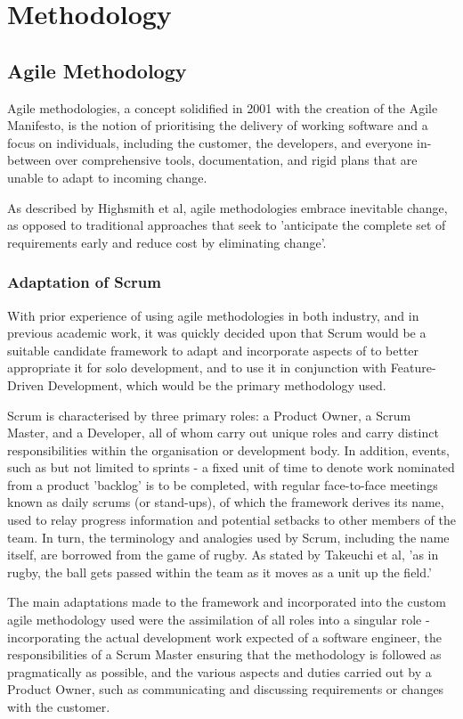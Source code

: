 \chapter{Methodology}

\section{Agile Methodology}
Agile methodologies, a concept solidified in 2001 with the creation of the Agile Manifesto, is the notion of prioritising the delivery of working software and a focus on individuals, including the customer, the developers, and everyone in-between over comprehensive tools, documentation, and rigid plans that are unable to adapt to incoming change. \cite{AgileAlliance1}

As described by Highsmith et al, agile methodologies embrace inevitable change, as opposed to traditional approaches that seek to 'anticipate the complete set of requirements early and reduce cost by eliminating change'. \cite{947100}

\subsection{Adaptation of Scrum}
With prior experience of using agile methodologies in both industry, and in previous academic work, it was quickly decided upon that Scrum would be a suitable candidate framework to adapt and incorporate aspects of to better appropriate it for solo development, and to use it in conjunction with Feature-Driven Development, which would be the primary methodology used.

Scrum is characterised by three primary roles: a Product Owner, a Scrum Master, and a Developer, all of whom carry out unique roles and carry distinct responsibilities within the organisation or development body. In addition, events, such as but not limited to sprints - a fixed unit of time to denote work nominated from a product 'backlog' is to be completed, with regular face-to-face meetings known as daily scrums (or stand-ups), of which the framework derives its name, used to relay progress information and potential setbacks to other members of the team. \cite{Scrum1} In turn, the terminology and analogies used by Scrum, including the name itself, are borrowed from the game of rugby. As stated by Takeuchi et al, 'as in rugby, the ball gets passed within the team as it moves as a unit up the field.' \cite{Hirotaka1}

The main adaptations made to the framework and incorporated into the custom agile methodology used were the assimilation of all roles into a singular role - incorporating the actual development work expected of a software engineer, the responsibilities of a Scrum Master ensuring that the methodology is followed as pragmatically as possible, and the various aspects and duties carried out by a Product Owner, such as communicating and discussing requirements or changes with the customer. \cite{Drumond1}


